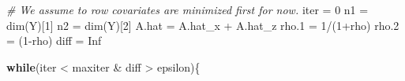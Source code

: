 \documentclass[
]{article}
\newenvironment{Shaded}{\begin{snugshade}}{\end{snugshade}}
\newcommand{\CommentTok}[1]{\textcolor[rgb]{0.56,0.35,0.01}{\textit{#1}}}
\newcommand{\ConstantTok}[1]{\textcolor[rgb]{0.00,0.00,0.00}{#1}}
\newcommand{\ControlFlowTok}[1]{\textcolor[rgb]{0.13,0.29,0.53}{\textbf{#1}}}
\newcommand{\DecValTok}[1]{\textcolor[rgb]{0.00,0.00,0.81}{#1}}
\newcommand{\FloatTok}[1]{\textcolor[rgb]{0.00,0.00,0.81}{#1}}
\newcommand{\FunctionTok}[1]{\textcolor[rgb]{0.00,0.00,0.00}{#1}}
\newcommand{\NormalTok}[1]{#1}
\newcommand{\OtherTok}[1]{\textcolor[rgb]{0.56,0.35,0.01}{#1}}
\newcommand{\SpecialCharTok}[1]{\textcolor[rgb]{0.00,0.00,0.00}{#1}}
\begin{document}
\begin{Shaded}
\begin{Highlighting}[]
   
   \CommentTok{\# We assume to row covariates are minimized first for now.}
\NormalTok{   iter }\OtherTok{=} \DecValTok{0}
\NormalTok{   n1 }\OtherTok{=} \FunctionTok{dim}\NormalTok{(Y)[}\DecValTok{1}\NormalTok{]}
\NormalTok{   n2 }\OtherTok{=} \FunctionTok{dim}\NormalTok{(Y)[}\DecValTok{2}\NormalTok{]}
\NormalTok{   A.hat }\OtherTok{=}\NormalTok{ A.hat\_x }\SpecialCharTok{+}\NormalTok{ A.hat\_z}
\NormalTok{   rho}\FloatTok{.1} \OtherTok{=} \DecValTok{1}\SpecialCharTok{/}\NormalTok{(}\DecValTok{1}\SpecialCharTok{+}\NormalTok{rho)}
\NormalTok{   rho}\FloatTok{.2} \OtherTok{=}\NormalTok{ (}\DecValTok{1}\SpecialCharTok{{-}}\NormalTok{rho)}
\NormalTok{   diff }\OtherTok{=} \ConstantTok{Inf}
   
   \ControlFlowTok{while}\NormalTok{(iter }\SpecialCharTok{\textless{}}\NormalTok{ maxiter }\SpecialCharTok{\&}\NormalTok{ diff }\SpecialCharTok{\textgreater{}}\NormalTok{ epsilon)\{}
      

\end{Highlighting}
\end{Shaded}
\end{document}

